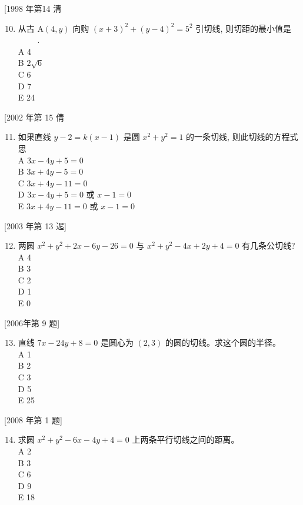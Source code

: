 \documentclass[10pt]{article}
\begin{document}
[1998 年第14 清

\begin{enumerate}
  \setcounter{enumi}{9}
  \item 从古 $\mathrm{A}(4, y)$ 向购 $(x+3)^{2}+(y-4)^{2}=5^{2}$ 引切线, 则切距的最小值是 $\qquad$ .\\
A 4\\
B $2 \sqrt{6}$\\
C 6\\
D 7\\
E 24
\end{enumerate}

[2002 年第 15 倩

\begin{enumerate}
  \setcounter{enumi}{10}
  \item 如果直线 $y-2=k(x-1)$ 是圆 $x^{2}+y^{2}=1$ 的一条切线, 则此切线的方程式思 $\qquad$\\
A $3 x-4 y+5=0$\\
B $3 x+4 y-5=0$\\
C $3 x+4 y-11=0$\\
D $3 x-4 y+5=0$ 或 $x-1=0$\\
E $3 x+4 y-11=0$ 或 $x-1=0$
\end{enumerate}

[2003 年第 13 迡]

\begin{enumerate}
  \setcounter{enumi}{11}
  \item 两圆 $x^{2}+y^{2}+2 x-6 y-26=0$ 与 $x^{2}+y^{2}-4 x+2 y+4=0$ 有几条公切线?\\
A 4\\
B 3\\
C 2\\
D 1\\
E 0
\end{enumerate}

[2006年第 9 题]

\begin{enumerate}
  \setcounter{enumi}{12}
  \item 直线 $7 x-24 y+8=0$ 是圆心为 $(2,3)$ 的圆的切线。求这个圆的半径。\\
A 1\\
B 2\\
C 3\\
D 5\\
E 25
\end{enumerate}

[2008 年第 1 题]

\begin{enumerate}
  \setcounter{enumi}{13}
  \item 求圆 $x^{2}+y^{2}-6 x-4 y+4=0$ 上两条平行切线之间的距离。\\
A 2\\
B 3\\
C 6\\
D 9\\
E 18
\end{enumerate}
\end{document}
